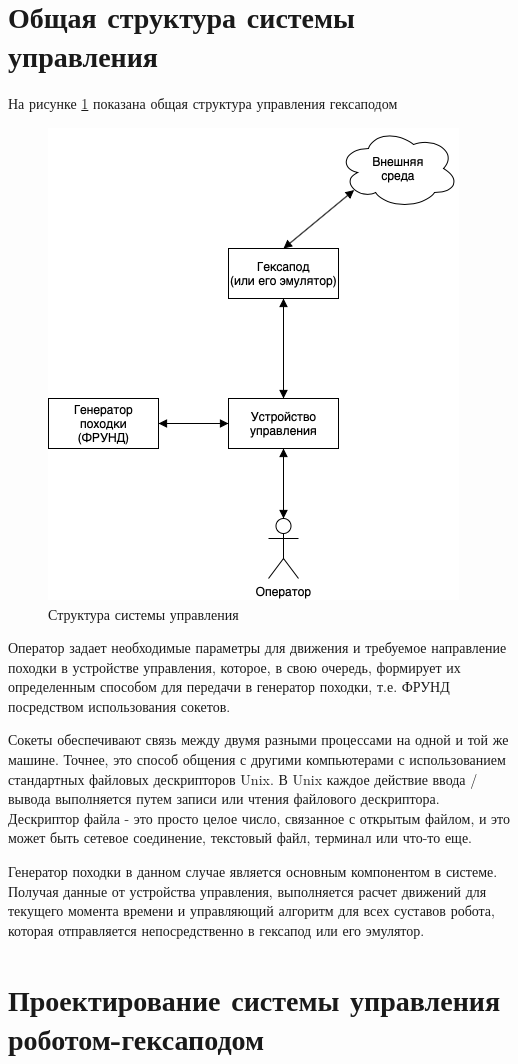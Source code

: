 \section{Общая структура системы управления}

На рисунке \ref{img:struct} показана общая структура управления гексаподом

\begin{figure}[]
	\centering
	\includegraphics[width = 0.5\linewidth]{img/struct}
	\caption{Структура системы управления}
	\label{img:struct}
\end{figure}

Оператор задает необходимые параметры для движения и требуемое направление походки в устройстве управления, которое, в свою очередь, формирует их определенным способом для передачи в генератор походки, т.е. ФРУНД посредством использования сокетов.

Сокеты обеспечивают связь между двумя разными процессами на одной и той же машине. Точнее, это способ общения с другими компьютерами с использованием стандартных файловых дескрипторов Unix. В Unix каждое действие ввода / вывода выполняется путем записи или чтения файлового дескриптора. Дескриптор файла - это просто целое число, связанное с открытым файлом, и это может быть сетевое соединение, текстовый файл, терминал или что-то еще.

Генератор походки в данном случае является основным компонентом в системе. Получая данные от устройства управления, выполняется расчет движений для текущего момента времени и управляющий алгоритм для всех суставов робота, которая отправляется непосредственно в гексапод или его эмулятор.

\section {Проектирование системы управления роботом-гексаподом}

